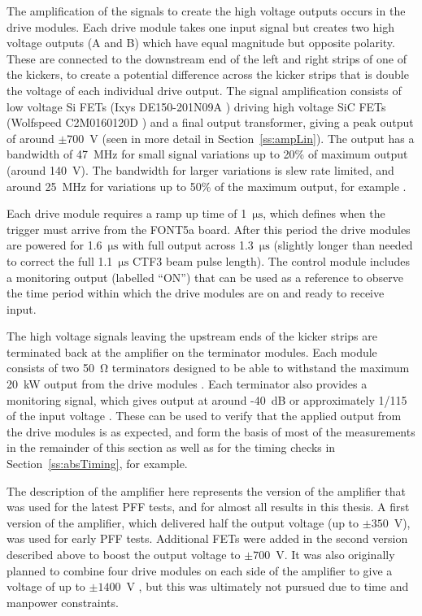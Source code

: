The amplification of the signals to create the high voltage outputs occurs in the drive modules. Each drive module takes one input signal but creates two high voltage outputs (A and B) which have equal magnitude but opposite polarity. These are connected to the downstream end of the left and right strips of one of the kickers, to create a potential difference across the kicker strips that is double the voltage of each individual drive output. The signal amplification consists of low voltage Si FETs (Ixys DE150-201N09A \cite{ixysFET}) driving high voltage SiC FETs (Wolfspeed C2M0160120D \cite{wolfFET}) and a final output transformer, giving a peak output of around \(\pm700\)~V (seen in more detail in Section~\ref{ss:ampLin}). The output has a bandwidth of 47~MHz for small signal variations up to 20\% of maximum output (around 140~V). The bandwidth for larger variations is slew rate limited, and around 25~MHz for variations up to 50\% of the maximum output, for example \cite{colinCLIC16}.

Each drive module requires a ramp up time of 1~\(\mathrm{\mu s}\), which defines when the trigger must arrive from the FONT5a board. After this period the drive modules are powered for 1.6~\(\mathrm{\mu s}\)  with full output across 1.3~\(\mathrm{\mu s}\) (slightly longer than needed to correct the full 1.1~\(\mathrm{\mu s}\) CTF3 beam pulse length). The control module includes a monitoring output (labelled ``ON'') that can be used as a reference to observe the time period within which the drive modules are on and ready to receive input.

The high voltage signals leaving the upstream ends of the kicker strips are terminated back at the amplifier on the terminator modules. Each module consists of two 50~\(\mathrm{\Omega}\) terminators designed to be able to withstand the maximum 20~kW output from the drive modules \cite{colinCLIC16}. Each terminator also provides a monitoring signal, which gives output at around -40~dB or approximately 1/115 of the input voltage \cite{colinPriv}. These can be used to verify that the applied output from the drive modules is as expected, and form the basis of most of the measurements in the remainder of this section as well as for the timing checks in Section~\ref{ss:absTiming}, for example.

The description of the amplifier here represents the version of the amplifier that was used for the latest PFF tests, and for almost all results in this thesis. A first version of the amplifier, which delivered half the output voltage (up to \(\pm350\)~V), was used for early PFF tests. Additional FETs were added in the second version described above to boost the output voltage to \(\pm700\)~V. 
It was also originally planned to combine four drive modules on each side of the amplifier to give a voltage of up to \(\pm1400\)~V \cite{glennCLIC13}, but this was ultimately not pursued due to time and manpower constraints. 


